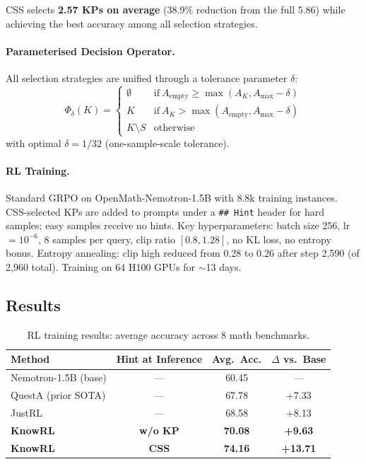 \documentclass[11pt]{article}
\begin{document}
CSS selects \textbf{2.57 KPs on average} (38.9\% reduction from the full 5.86) while achieving the best accuracy among all selection strategies.

\paragraph{Parameterised Decision Operator.}
All selection strategies are unified through a tolerance parameter $\delta$:
\begin{equation}
    \Phi_\delta(K) = \begin{cases}
        \emptyset & \mathrm{if}\ A_{\mathrm{empty}} \geq \max(A_K, A_{\mathrm{max}} - \delta) \\
        K & \mathrm{if}\ A_K > \max(A_{\mathrm{empty}}, A_{\mathrm{max}} - \delta) \\
        K \setminus S & \mathrm{otherwise}
    \end{cases}
\end{equation}
with optimal $\delta = 1/32$ (one-sample-scale tolerance).

\paragraph{RL Training.}
Standard GRPO on OpenMath-Nemotron-1.5B with 8.8k training instances. CSS-selected KPs are added to prompts under a \texttt{\#\# Hint} header for hard samples; easy samples receive no hints. Key hyperparameters: batch size 256, lr $= 10^{-6}$, 8 samples per query, clip ratio $[0.8, 1.28]$, no KL loss, no entropy bonus. Entropy annealing: clip high reduced from 0.28 to 0.26 after step 2{,}590 (of 2{,}960 total). Training on 64 H100 GPUs for $\sim$13 days.

\subsection{Results}

\begin{table}[h]
\centering
\caption{RL training results: average accuracy across 8 math benchmarks.}
\begin{tabular}{lccc}
\toprule
\textbf{Method} & \textbf{Hint at Inference} & \textbf{Avg.\ Acc.} & \textbf{$\Delta$ vs.\ Base} \\
\midrule
Nemotron-1.5B (base) & --- & 60.45 & --- \\
QuestA (prior SOTA) & --- & 67.78 & +7.33 \\
JustRL & --- & 68.58 & +8.13 \\
\textbf{KnowRL} & \textbf{w/o KP} & \textbf{70.08} & \textbf{+9.63} \\
\textbf{KnowRL} & \textbf{CSS} & \textbf{74.16} & \textbf{+13.71} \\
\bottomrule
\end{tabular}
\end{table}
\end{document}
